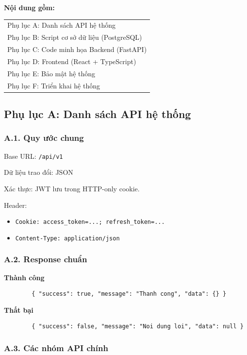 \documentclass[13pt,a4paper]{extarticle}
\numberwithin{figure}{section}
\numberwithin{table}{section}
\begin{document}
	\noindent\textbf{Nội dung gồm:}
	
	\noindent
	\begin{tabular}{@{}l@{}}
		Phụ lục A: Danh sách API hệ thống\\
		Phụ lục B: Script cơ sở dữ liệu (PostgreSQL)\\
		Phụ lục C: Code minh họa Backend (FastAPI)\\
		Phụ lục D: Frontend (React + TypeScript)\\
		Phụ lục E: Bảo mật hệ thống\\
		Phụ lục F: Triển khai hệ thống
	\end{tabular}
	
	\subsection*{Phụ lục A: Danh sách API hệ thống}
	
	\subsubsection*{A.1. Quy ước chung}
	
	Base URL: \texttt{/api/v1}
	
	Dữ liệu trao đổi: JSON
	
	Xác thực: JWT lưu trong HTTP-only cookie.
	
	Header:
	\begin{itemize}
		\item \texttt{Cookie: access\_token=...; refresh\_token=...}
		\item \texttt{Content-Type: application/json}
	\end{itemize}
	
	\subsubsection*{A.2. Response chuẩn}
	
	\noindent
	\textbf{Thành công}
	
	\noindent
	\begin{lstlisting}
		{ "success": true, "message": "Thanh cong", "data": {} }
	\end{lstlisting}
	
	\noindent
	\textbf{Thất bại}
	
	\begin{lstlisting}
		{ "success": false, "message": "Noi dung loi", "data": null }
	\end{lstlisting}
	
	\subsubsection*{A.3. Các nhóm API chính}
	
\end{document}
